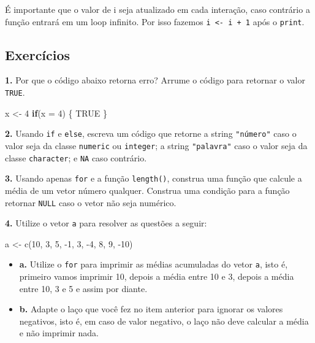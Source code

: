 \documentclass[
]{book}
\newenvironment{Shaded}{\begin{snugshade}}{\end{snugshade}}
\newcommand{\AttributeTok}[1]{\textcolor[rgb]{0.77,0.63,0.00}{#1}}
\newcommand{\ConstantTok}[1]{\textcolor[rgb]{0.00,0.00,0.00}{#1}}
\newcommand{\ControlFlowTok}[1]{\textcolor[rgb]{0.13,0.29,0.53}{\textbf{#1}}}
\newcommand{\DecValTok}[1]{\textcolor[rgb]{0.00,0.00,0.81}{#1}}
\newcommand{\FunctionTok}[1]{\textcolor[rgb]{0.00,0.00,0.00}{#1}}
\newcommand{\NormalTok}[1]{#1}
\newcommand{\OtherTok}[1]{\textcolor[rgb]{0.56,0.35,0.01}{#1}}
\newcommand{\SpecialCharTok}[1]{\textcolor[rgb]{0.00,0.00,0.00}{#1}}
\begin{document}
É importante que o valor de i seja atualizado em cada interação, caso contrário a função entrará em um loop infinito. Por isso fazemos \texttt{i\ \textless{}-\ i\ +\ 1} após o \texttt{print}.

\hypertarget{exercuxedcios-8}{%
\subsection*{Exercícios}\label{exercuxedcios-8}}

\textbf{1.} Por que o código abaixo retorna erro? Arrume o código para retornar o valor \texttt{TRUE}.

\begin{Shaded}
\begin{Highlighting}[]
\NormalTok{x }\OtherTok{\textless{}{-}} \DecValTok{4}
\ControlFlowTok{if}\NormalTok{(}\AttributeTok{x =} \DecValTok{4}\NormalTok{) \{}
  \ConstantTok{TRUE}
\NormalTok{\}}
\end{Highlighting}
\end{Shaded}

\textbf{2.} Usando \texttt{if} e \texttt{else}, escreva um código que retorne a string \texttt{"número"} caso o valor seja da classe \texttt{numeric} ou \texttt{integer}; a string \texttt{"palavra"} caso o valor seja da classe \texttt{character}; e \texttt{NA} caso contrário.

\textbf{3.} Usando apenas \texttt{for} e a função \texttt{length()}, construa uma função que calcule a média de um vetor número qualquer. Construa uma condição para a função retornar \texttt{NULL} caso o vetor não seja numérico.

\textbf{4.} Utilize o vetor \texttt{a} para resolver as questões a seguir:

\begin{Shaded}
\begin{Highlighting}[]
\NormalTok{a }\OtherTok{\textless{}{-}} \FunctionTok{c}\NormalTok{(}\DecValTok{10}\NormalTok{, }\DecValTok{3}\NormalTok{, }\DecValTok{5}\NormalTok{, }\SpecialCharTok{{-}}\DecValTok{1}\NormalTok{, }\DecValTok{3}\NormalTok{, }\SpecialCharTok{{-}}\DecValTok{4}\NormalTok{, }\DecValTok{8}\NormalTok{, }\DecValTok{9}\NormalTok{, }\SpecialCharTok{{-}}\DecValTok{10}\NormalTok{)}
\end{Highlighting}
\end{Shaded}

\begin{itemize}
\item
  \textbf{a.} Utilize o \texttt{for} para imprimir as médias acumuladas do vetor \texttt{a}, isto é, primeiro vamos imprimir 10, depois a média entre 10 e 3, depois a média entre 10, 3 e 5 e assim por diante.
\item
  \textbf{b.} Adapte o laço que você fez no item anterior para ignorar os valores negativos, isto é, em caso de valor negativo, o laço não deve calcular a média e não imprimir nada.
\end{itemize}
\end{document}
